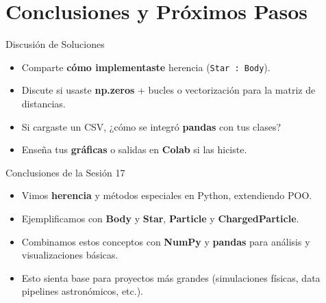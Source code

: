 \documentclass[10pt]{beamer}
\begin{document}
\section{Conclusiones y Próximos Pasos}

\begin{frame}{Discusión de Soluciones}
  \begin{itemize}
    \item Comparte \textbf{cómo implementaste} herencia (\texttt{Star : Body}).
    \item Discute si usaste \textbf{np.zeros} + bucles o vectorización para la matriz de distancias.
    \item Si cargaste un CSV, ¿cómo se integró \textbf{pandas} con tus clases?
    \item Enseña tus \textbf{gráficas} o salidas en \textbf{Colab} si las hiciste.
  \end{itemize}
\end{frame}

\begin{frame}{Conclusiones de la Sesión 17}
  \begin{itemize}
    \item Vimos \textbf{herencia} y métodos especiales en Python, extendiendo POO.
    \item Ejemplificamos con \textbf{Body} y \textbf{Star}, \textbf{Particle} y \textbf{ChargedParticle}.
    \item Combinamos estos conceptos con \textbf{NumPy} y \textbf{pandas} para análisis y visualizaciones básicas.
    \item Esto sienta base para proyectos más grandes (simulaciones físicas, data pipelines astronómicos, etc.).
  \end{itemize}
\end{frame}
\end{document}
